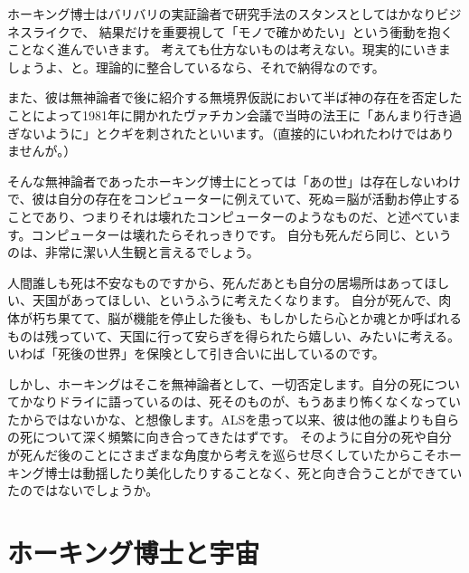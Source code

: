 \documentclass[10pt,b5paper,papersize,dvipdfmx]{jsbook}
\begin{document}
ホーキング博士はバリバリの実証論者で研究手法のスタンスとしてはかなりビジネスライクで、
結果だけを重要視して「モノで確かめたい」という衝動を抱くことなく進んでいきます。
考えても仕方ないものは考えない。現実的にいきましょうよ、と。理論的に整合しているなら、それで納得なのです。\par
また、彼は無神論者で後に紹介する無境界仮説において半ば神の存在を否定したことによって1981年に開かれたヴァチカン会議で当時の法王に「あんまり行き過ぎないように」とクギを刺されたといいます。（直接的にいわれたわけではありませんが。）\par
そんな無神論者であったホーキング博士にとっては「あの世」は存在しないわけで、彼は自分の存在をコンピューターに例えていて、死ぬ＝脳が活動お停止することであり、つまりそれは壊れたコンピューターのようなものだ、と述べています。コンピューターは壊れたらそれっきりです。
自分も死んだら同じ、というのは、非常に潔い人生観と言えるでしょう。\par
人間誰しも死は不安なものですから、死んだあとも自分の居場所はあってほしい、天国があってほしい、というふうに考えたくなります。
自分が死んで、肉体が朽ち果てて、脳が機能を停止した後も、もしかしたら心とか魂とか呼ばれるものは残っていて、天国に行って安らぎを得られたら嬉しい、みたいに考える。いわば「死後の世界」を保険として引き合いに出しているのです。\par
しかし、ホーキングはそこを無神論者として、一切否定します。自分の死についてかなりドライに語っているのは、死そのものが、もうあまり怖くなくなっていたからではないかな、と想像します。ALSを患って以来、彼は他の誰よりも自らの死について深く頻繁に向き合ってきたはずです。
そのように自分の死や自分が死んだ後のことにさまざまな角度から考えを巡らせ尽くしていたからこそホーキング博士は動揺したり美化したりすることなく、死と向き合うことができていたのではないでしょうか。\par



\newpage

\section{ホーキング博士と宇宙}
\end{document}
